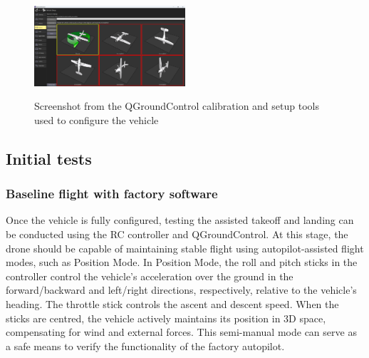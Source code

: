\begin{figure}[H]
  \centering
  \\
  \includegraphics[width=0.5\textwidth, keepaspectratio]{img/qgc-config-2.png}
  \caption{Screenshot from the QGroundControl calibration and setup tools used to configure the vehicle}\label{fig:qgc-config}
\end{figure}


\subsection{Initial tests}
\label{sec:test-8-flight}


\subsubsection{Baseline flight with factory software}
\label{subsec:fl-test-1}

Once the vehicle is fully configured, testing the assisted takeoff and landing can be conducted using the RC controller and QGroundControl. At this stage, the drone should be capable of maintaining stable flight using autopilot-assisted flight modes, such as Position Mode. In Position Mode, the roll and pitch sticks in the controller control the vehicle's acceleration over the ground in the forward/backward and left/right directions, respectively, relative to the vehicle's heading. The throttle stick controls the ascent and descent speed. When the sticks are centred, the vehicle actively maintains its position in 3D space, compensating for wind and external forces. This semi-manual mode can serve as a safe means to verify the functionality of the factory autopilot.



